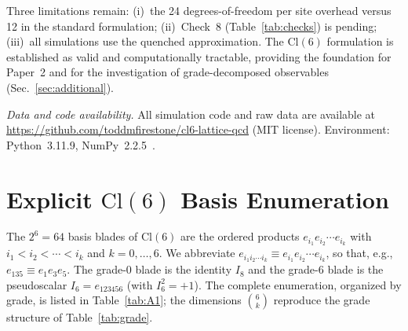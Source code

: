 \documentclass[12pt]{article}
\newcommand{\cl}{\mathrm{Cl}}          %
\begin{document}
Three limitations remain: (i)~the 24 degrees-of-freedom per site
overhead versus 12 in the standard formulation; (ii)~Check~8
(Table~\ref{tab:checks}) is pending; (iii)~all simulations use the
quenched approximation.  The $\cl(6)$ formulation is established as
valid and computationally tractable, providing the foundation for
Paper~2 and for the investigation of grade-decomposed observables
(Sec.~\ref{sec:additional}).

\medskip
\noindent\textit{Data and code availability.}\enspace
All simulation code and raw data are available at
\url{https://github.com/toddmfirestone/cl6-lattice-qcd} (MIT license).
Environment: Python~3.11.9, NumPy~2.2.5~\cite{Harris2020}.

\appendix
\renewcommand{\thetable}{\thesection.\arabic{table}}

\section{Explicit \texorpdfstring{$\cl(6)$}{Cl(6)} Basis Enumeration}
\label{app:A}
\setcounter{table}{0}

\noindent
The $2^6 = 64$ basis blades of $\cl(6)$ are the ordered products
$e_{i_1}e_{i_2}\cdots e_{i_k}$ with $i_1 < i_2 < \cdots < i_k$ and
$k = 0,\ldots,6$.  We abbreviate
$e_{i_1 i_2 \cdots i_k}\equiv e_{i_1}e_{i_2}\cdots e_{i_k}$, so that,
e.g., $e_{135}\equiv e_1 e_3 e_5$.  The grade-$0$ blade is the identity
$I_8$ and the grade-$6$ blade is the pseudoscalar
$I_6 = e_{123456}$ (with $I_6^2 = +1$).  The complete enumeration,
organized by grade, is listed in Table~\ref{tab:A1}; the dimensions
$\binom{6}{k}$ reproduce the grade structure of Table~\ref{tab:grade}.
\end{document}
